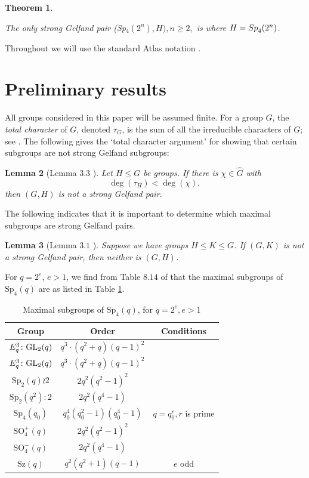 \documentclass[10pt,a4paper]{amsart}
\newtheorem{thm}{Theorem}[section]
\newtheorem{lem}[thm]{Lemma}
\theoremstyle{plain}
\theoremstyle{definition}
\numberwithin{equation}{section}
\begin{document}
\begin{thm}\label{Thm1}

The only strong Gelfand pair {\rm (Sp}$_4(2^n),H),n\ge 2,$ is where $H={\rm Sp}_4(2^n)$. 
\end{thm}
 

Throughout we will use the standard  Atlas notation \cite {Atl}.
\medskip 




\section{Preliminary results}
\FloatBarrier


All groups considered in this paper will be assumed finite. 
For a  group $G$, the \textit{total character} of $G$, denoted $\tau_G$, is the sum of all the irreducible characters of $G$; see \cite {Tot1,Tot3,Tot2}. The following gives the `total character argument' for showing that certain subgroups are not strong Gelfand subgroups:

\begin{lem} [Lemma $3.3$ \cite {GH}] \label{lem:totalchar} Let $H\leq G$ be   groups. If there is  $\chi\in \hat G$ with 
$$
\deg(\tau_H) < \deg(\chi),
$$
 then $(G, H)$ is not a strong Gelfand pair.
\end{lem}

The following indicates that it is important to determine which maximal subgroups are strong Gelfand pairs. 


\begin{lem}  [Lemma $3.1$ \cite {BH}]  \label{lem:totalstack} Suppose we have groups $H\leq K\leq G$. If $(G, K)$ is not a strong Gelfand pair, then neither is $(G, H)$.
\end{lem}



For  $q=2^e$,  $e>1$, we find from Table $8.14$ of \cite{max} that   the maximal subgroups of $\mathrm{Sp}_4(q)$  are as listed in Table \ref{maxeven}.

\begin{table}[h!]
\centering
\caption{Maximal subgroups of $\mathrm{Sp}_4(q)$, for $q=2^e, e>1$}
\label{maxeven}
\vspace{5pt}
\begin{tabular}{|ccc|}
\hline
Group & Order& Conditions\\
\hline
$\vphantom{E^{3^2}}E_q^3\colon\mathrm{GL}_2(q)$ & $q^3\cdot (q^2+q)(q-1)^2$ & \\%
$\vphantom{E^{3^2}}E_q^3\colon\mathrm{GL}_2(q)$ & $q^3\cdot (q^2+q)(q-1)^2$ & \\%
$\mathrm{Sp}_2(q)\wr 2$ & $2q^2(q^2-1)^2$ & \\%
$\mathrm{Sp}_2(q^2)\colon 2$ & $2q^2(q^4-1)$ & \\
$\mathrm{Sp}_4(q_0)$ & $q_0^4(q_0^2-1)(q_0^4-1)$ & $q=q_0^r, r$ is prime\\%
$\mathrm{SO}_4^+(q)$ & $2q^2(q^2-1)^2$ & \\
$\mathrm{SO}_4^-(q)$ & $2q^2(q^4-1)$ & \\
$\mathrm{Sz}(q)$ & $q^2(q^2+1)(q-1)$ & $e$ odd\\%
\hline
\end{tabular}
\end{table}
\end{document}
